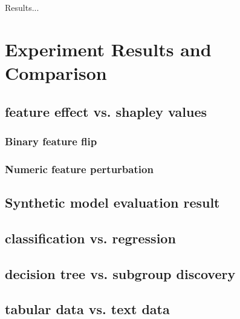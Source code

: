 Results...

\section{Experiment Results and Comparison}

\subsection{feature effect vs. shapley values}

	\subsubsection{Binary feature flip}
	\subsubsection{Numeric feature perturbation}

\subsection{Synthetic model evaluation result}

\subsection{classification vs. regression}

\subsection{decision tree vs. subgroup discovery}

\subsection{tabular data vs. text data} 


